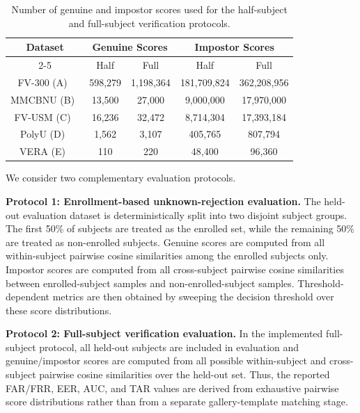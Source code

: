 \documentclass[10pt,journal,compsoc]{IEEEtran}
\begin{document}
\begin{table}[ht!]
    \centering
    \scriptsize
    \begin{tabular}{|c|c|c|c|c|}
        \hline
        \multirow{2}{*}{Dataset} & \multicolumn{2}{c|}{Genuine Scores} & \multicolumn{2}{c|}{Impostor Scores} \\
        \cline{2-5}
         & Half & Full & Half & Full \\
        \hline
        FV-300 (A)~\cite{veinatnnet} & 598,279 & 1,198,364 & 181,709,824 & 362,208,956 \\
        \hline
        MMCBNU (B)~\cite{mmcbnu} & 13,500 & 27,000 & 9,000,000 & 17,970,000 \\
        \hline
        FV-USM (C)~\cite{fvusm} & 16,236 & 32,472 & 8,714,304 & 17,393,184 \\
        \hline
        PolyU (D)~\cite{polyu} & 1,562 & 3,107 & 405,765 & 807,794 \\
        \hline
        VERA (E)~\cite{vera} & 110 & 220 & 48,400 & 96,360 \\
        \hline
    \end{tabular}
    \medskip
    \caption{Number of genuine and impostor scores used for the half-subject and full-subject verification protocols.}
    \label{tab:rebuttal_score_counts}
\end{table}

We consider two complementary evaluation protocols.

\textbf{Protocol 1: Enrollment-based unknown-rejection evaluation.}
The held-out evaluation dataset is deterministically split into two disjoint subject groups. The first 50\% of subjects are treated as the enrolled set, while the remaining 50\% are treated as non-enrolled subjects. Genuine scores are computed from all within-subject pairwise cosine similarities among the enrolled subjects only. Impostor scores are computed from all cross-subject pairwise cosine similarities between enrolled-subject samples and non-enrolled-subject samples. Threshold-dependent metrics are then obtained by sweeping the decision threshold over these score distributions.

\textbf{Protocol 2: Full-subject verification evaluation.}
In the implemented full-subject protocol, all held-out subjects are included in evaluation and genuine/impostor scores are computed from all possible within-subject and cross-subject pairwise cosine similarities over the held-out set. Thus, the reported FAR/FRR, EER, AUC, and TAR values are derived from exhaustive pairwise score distributions rather than from a separate gallery-template matching stage.
\end{document}
